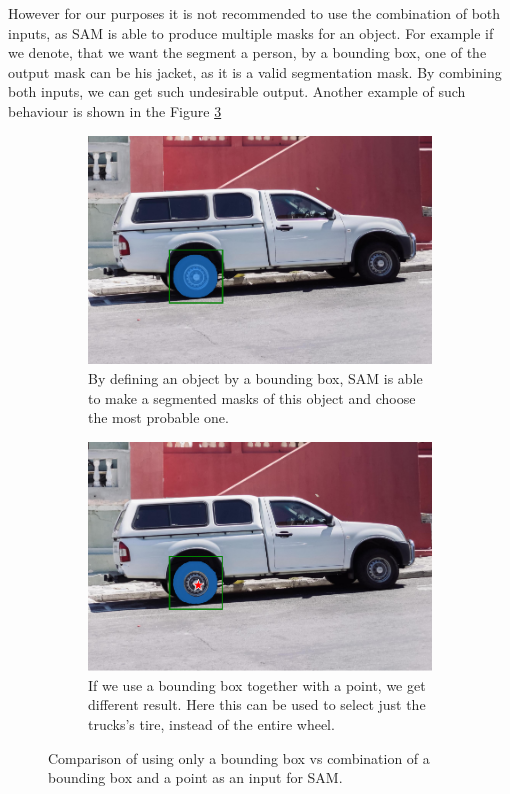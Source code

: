 However for our purposes it is not recommended
to use the combination of both inputs, as SAM is able to produce multiple masks for an object. For example if we
denote, that we want the segment a person, by a bounding box, one of the output mask can be his jacket, as it is a
valid segmentation mask. By combining both inputs, we can get such undesirable output. Another example of such behaviour
is shown in the Figure \ref{fig:sam_examples}
\begin{figure}[htbp]
  \centering
  \begin{subfigure}[h]{0.48\textwidth}
    \centering
    \includegraphics[width=\textwidth]{text/chapter_04/imgs/SAM_box}
    \caption{By defining an object by a bounding box, SAM is able to make a segmented masks of this object and choose
    the most probable one.}
    \label{fig:sam_box}
  \end{subfigure}
  \hfill
  \begin{subfigure}[h]{0.48\textwidth}
    \centering
    \includegraphics[width=\textwidth]{text/chapter_04/imgs/SAM_box_point}
    \caption{If we use a bounding box together with a point, we get different result. Here this can be used to select just the trucks's tire, instead of the entire wheel.}
    \label{fig:sam_boxPoint}
  \end{subfigure}
  \caption{Comparison of using only a bounding box vs combination of a bounding box and a point as an input for SAM.}
  \label{fig:sam_examples}
\end{figure}

